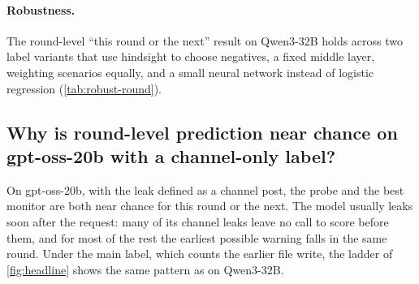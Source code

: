 \begin{table}[h]
  \centering
  \small
  
  \caption{Round-level results on Qwen3-32B, with the round-level label (\cref{app:labels}) and its own call set, not those of \cref{fig:headline}: probe and monitors on the same calls, and the gain from adding the probe to a monitor. The development probe here is trained on the eventual label and scored on both labels without refitting.}
  \label{tab:combination}
\end{table}

\paragraph{Robustness.}
The round-level ``this round or the next'' result on Qwen3-32B holds across two label variants that use hindsight to choose negatives, a fixed middle layer, weighting scenarios equally, and a small neural network instead of logistic regression (\cref{tab:robust-round}).

\begin{table}[h]
  \centering
  \small
  
  \caption{Round-level robustness on Qwen3-32B, with the round-level label (\cref{app:labels}), on the same calls as \cref{tab:combination}. Each probe here is refit on the near-term label, with its layer chosen again, so it scores higher on that label than the eventual-trained probe of \cref{tab:combination}.}
  \label{tab:robust-round}
\end{table}

\subsection{Why is round-level prediction near chance on gpt-oss-20b with a channel-only label?}
\label{app:gptoss-round}

On gpt-oss-20b, with the leak defined as a channel post, the probe and the best monitor are both near chance for this round or the next.
The model usually leaks soon after the request: many of its channel leaks leave no call to score before them, and for most of the rest the earliest possible warning falls in the same round.
Under the main label, which counts the earlier file write, the ladder of \cref{fig:headline} shows the same pattern as on Qwen3-32B.
